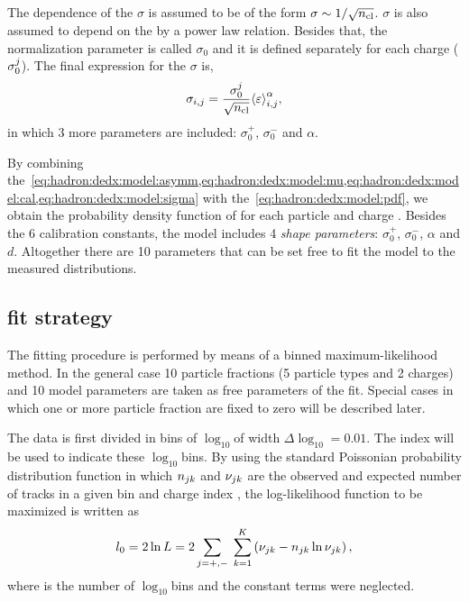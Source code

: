 The \ncl dependence of the $\sigma$ is assumed to be of the form
$\sigma \sim 1/\sqrt{\mbox{$n_{\text{cl}}$}}$. $\sigma$ is also assumed to depend
on the \meaneps by a power law relation. Besides that,
the normalization parameter is called
$\sigma_0$ and it is defined separately for each charge ($\sigma_0^{j}$).
The final expression for the $\sigma$ is,
\begin{equation}
  \sigma_{i,j} = \frac{\sigma_0^{j}}{\sqrt{\mbox{$n_{\text{cl}}$}}} \mbox{$\langle\varepsilon\rangle$}_{i,j}^{\alpha},
  \label{eq:hadron:dedx:model:sigma}
\end{equation}
in which 3 more parameters are included: $\sigma_0^+$, $\sigma_0^-$ and $\alpha$. 

By combining
the~\cref{eq:hadron:dedx:model:asymm,eq:hadron:dedx:model:mu,eq:hadron:dedx:model:cal,eq:hadron:dedx:model:sigma}
with the~\cref{eq:hadron:dedx:model:pdf}, we obtain the probability density
function of \eps for each particle \ipart and charge \ich. Besides the 6 calibration constants,
the model includes 4 \textit{shape parameters}: $\sigma_0^+$, $\sigma_0^-$, $\alpha$ and $d$.
Altogether there are 10 parameters that can be set free to fit the model
to the measured \eps distributions.


\subsection{\dedx fit strategy}
\label{sec:hadron:dedx:fit}


The fitting procedure is performed by means of a binned maximum-likelihood method.
In the general case 10 particle fractions (5 particle types and 2 charges) and
10 model parameters are taken as free parameters of the fit. Special cases
in which one or more particle fraction are fixed to zero will be described later.

The \eps data is first divided in bins of $\log_{10}$\eps of width $\Delta\log_{10}$\eps$=0.01$.
The index \ieps will be used to indicate these $\log_{10}$\eps bins.
By using the standard Poissonian probability distribution function in which
$n_{jk}$ and $\nu_{jk}$ are the observed and expected
number of tracks in a given bin \ieps and charge index \ich,
the log-likelihood function to be maximized is written as
\begin{equation}
  l_0 = 2\ln L = 2\sum_{j=+,-}\;\sum_{k=1}^{K} \left(\nu_{jk} - n_{jk}\ln\nu_{jk}\right), 
  \label{eq:hadron:dedx:fit:l0}
\end{equation}
where \neps is the number of $\log_{10}$\eps bins and the constant terms were neglected.

